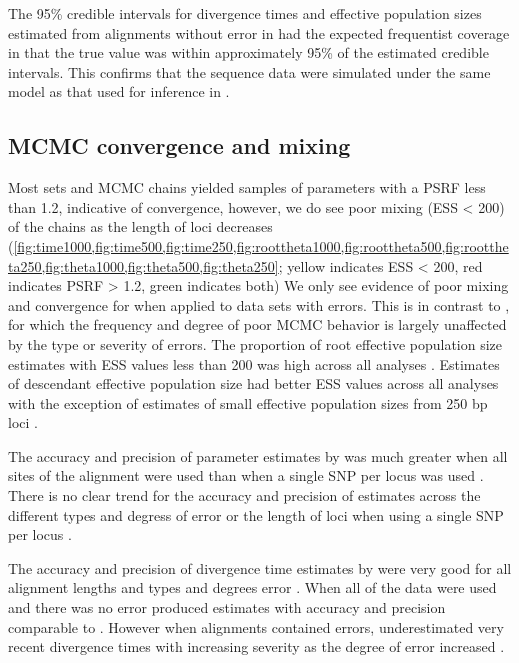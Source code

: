 The 95\% credible intervals for divergence times and effective population 
sizes estimated from alignments without error in \beast had the expected 
frequentist coverage in that the true value was within approximately 95\% of the 
estimated credible intervals. 
This confirms that the sequence data were simulated under the same model as 
that used for inference in \beast. 


\subsection{MCMC convergence and mixing}
Most sets \beast and \ecoevolity MCMC chains yielded samples of parameters with
a PSRF less than 1.2, indicative of convergence,
however, we do see poor mixing (ESS < 200) of the \beast chains as the length
of loci decreases
(\cref{fig:time1000,fig:time500,fig:time250,fig:roottheta1000,fig:roottheta500,fig:roottheta250,fig:theta1000,fig:theta500,fig:theta250};
yellow indicates ESS < 200, red indicates PSRF > 1.2, green indicates both)
We only see evidence of poor mixing and convergence for \ecoevolity when
applied to data sets with errors.
This is in contrast to \beast, for which the frequency and degree of poor MCMC
behavior is largely unaffected by the type or severity of errors.
The proportion of \beast root effective population size estimates with ESS 
values less than 200 was high across all analyses \rootfigs. 
Estimates of descendant effective population size had better ESS values across all 
analyses with the exception of estimates of small effective population sizes from 
250 bp loci \thetafigs.

The accuracy and precision of parameter estimates by \ecoevolity was much greater
when all sites of the alignment were used than when a single SNP per locus was used \mainfigs.  
There is no clear trend for the accuracy and precision of \ecoevolity estimates across the
different types and degress of error or the length of loci when using a single SNP per locus \mainfigs. 

The accuracy and precision of divergence time estimates by \beast were very good for all 
alignment lengths and types and degrees error \timefigs. 
When all of the data were used and there was no error \ecoevolity produced 
estimates with accuracy and precision comparable to \beast \timefigs. 
However when alignments contained errors, \ecoevolity underestimated very recent 
divergence times with increasing severity as the degree of error increased \timefigs. 

